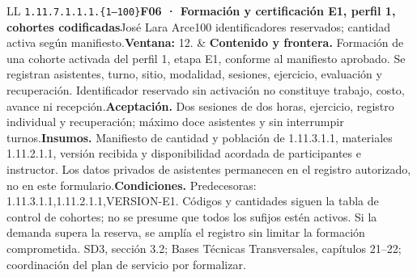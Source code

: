 \begin{longtable}{L{\tabcolsep\relax}L{\tabcolsep\relax}}
\texttt{1.\allowbreak{}11.\allowbreak{}7.\allowbreak{}1.\allowbreak{}1.\allowbreak{}1.\allowbreak{}\{1--100\}}\newline{}\textbf{F06 · Formación y certificación E1, perfil 1, cohortes codificadas}\newline{}José Lara Arce\newline{}100 identificadores reservados; cantidad activa según manifiesto.\newline{}\textbf{Ventana:} 12. & \textbf{Contenido y frontera.} Formación de una cohorte activada del perfil 1, etapa E1, conforme al manifiesto aprobado. Se registran asistentes, turno, sitio, modalidad, sesiones, ejercicio, evaluación y recuperación. Identificador reservado sin activación no constituye trabajo, costo, avance ni recepción.\newline{}\textbf{Aceptación.} Dos sesiones de dos horas, ejercicio, registro individual y recuperación; máximo doce asistentes y sin interrumpir turnos.\newline{}\textbf{Insumos.} Manifiesto de cantidad y población de 1.11.3.1.1, materiales 1.11.2.1.1, versión recibida y disponibilidad acordada de participantes e instructor. Los datos privados de asistentes permanecen en el registro autorizado, no en este formulario.\newline{}\textbf{Condiciones.} Predecesoras: 1.11.3.1.1,1.11.2.1.1,VERSION-E1. Códigos y cantidades siguen la tabla de control de cohortes; no se presume que todos los sufijos estén activos. Si la demanda supera la reserva, se amplía el registro sin limitar la formación comprometida. SD3, sección 3.2; Bases Técnicas Transversales, capítulos 21--22; coordinación del plan de servicio por formalizar.\\\hline

\end{longtable}
